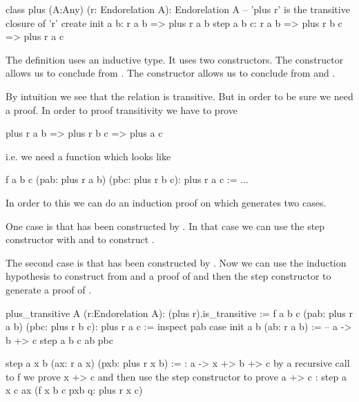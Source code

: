 \begin{alba}
  class
    plus (A:Any) (r: Endorelation A): Endorelation A
      -- 'plus r' is the transitive closure of 'r'
  create
    init a b:
      r a b
      => plus r a b
    step a b c:
      r a b
      => plus r b c
      => plus r a c
\end{alba}

The definition uses an inductive type. It uses two constructors. The
 constructor allows us to conclude  from .
The  constructor allows us to conclude  from
 and .

By intuition we see that the relation  is transitive. But in
order to be sure we need a proof. In order to proof transitivity we have to
prove
%
\begin{alba}
  plus r a b => plus r b c => plus a c
\end{alba}
%
i.e. we need a function which looks like
%
\begin{alba}
  f a b c (pab: plus r a b) (pbc: plus r b c): plus r a c :=
    ...
\end{alba}
%
In order to this we can do an induction proof on  which
generates two cases.

One case is that  has been constructed
by . In that case we can use the step constructor with
 and  to construct .

The second case is that   has been constructed by . Now we can use the induction
hypothesis to construct from  and  a proof of  and then the step constructor to generate a proof of .


\begin{alba}
  plus_transitive A (r:Endorelation A): (plus r).is_transitive :=
    f a b c (pab: plus r a b) (pbc: plus r b c): plus r a c :=
      inspect
        pab
      case
        init a b (ab: r a b) :=
            -- a -> b +> c
          step a b c ab pbc

        step a x b (ax: r a x) (pxb: plus r x b) :=
            {: a -> x +> b +> c
               by a recursive call to f we prove x +> c
               and then use the step constructor to prove a +> c :}
          step a x c ax (f x b c pxb q: plus r x c)
\end{alba}

